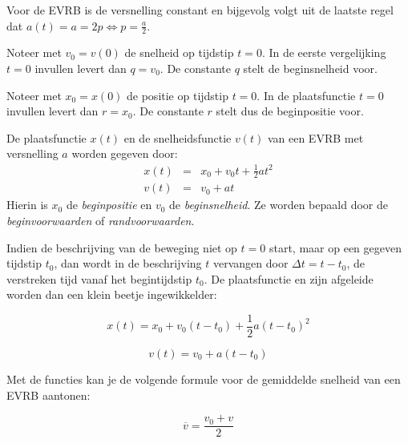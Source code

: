 \documentclass{ximera}
\begin{document}
Voor de EVRB is de versnelling constant en bijgevolg volgt uit de laatste regel dat $a(t)=a=2p\Leftrightarrow p=\frac{a}{2}$. 

Noteer met $v_0=v(0)$ de snelheid op tijdstip $t=0$. In de eerste vergelijking $t=0$ invullen levert dan $q=v_0$. De constante $q$ stelt de beginsnelheid voor. 

Noteer met $x_0=x(0)$ de positie op tijdstip $t=0$. In de plaatsfunctie $t=0$ invullen levert dan $r=x_0$. De constante $r$ stelt dus de beginpositie voor.


\begin{theorem}
De plaatsfunctie $x(t)$ en de snelheidsfunctie $v(t)$ van een EVRB met versnelling $a$ worden gegeven door:
\[
\begin{array}{rcl}
x(t)&=&x_0+v_0t+\frac{1}{2}at^2\\
v(t)&=&v_0+at
\end{array}
\]
Hierin is $x_0$ de \textit{beginpositie} en $v_0$ de \textit{beginsnelheid}. Ze worden bepaald door de \textit{beginvoorwaarden} of \textit{randvoorwaarden}.
\end{theorem}	

Indien de beschrijving van de beweging niet op $t=0$ start, maar op een gegeven tijdstip $t_0$, dan wordt in de beschrijving $t$ vervangen door $\Delta t= t-t_0$, de verstreken tijd vanaf het begintijdstip $t_0$. De plaatsfunctie en zijn afgeleide worden dan een klein beetje ingewikkelder:

\[
x(t) = x_0+v_0(t-t_0)+\frac{1}{2}a(t-t_0)^2
\]

\[
v(t) = v_0+a(t-t_0)
\]

Met de functies kan je de volgende formule voor de gemiddelde snelheid van een EVRB aantonen:


\[
\overline{v}=\frac{v_0+v}{2}
\]
	
\end{document}
